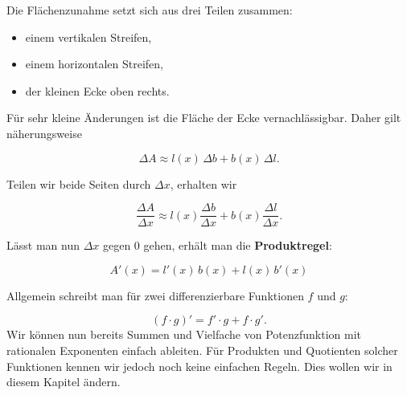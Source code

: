 \begin{center}
\end{center}

Die Flächenzunahme setzt sich aus drei Teilen zusammen:

\begin{itemize}
    \item einem vertikalen Streifen,
    \item einem horizontalen Streifen,
    \item der kleinen Ecke oben rechts.
\end{itemize}

Für sehr kleine Änderungen ist die Fläche der Ecke vernachlässigbar. Daher gilt näherungsweise

\[
    \Delta A
    \approx
    l(x)\,\Delta b
    +
    b(x)\,\Delta l.
\]

Teilen wir beide Seiten durch \(\Delta x\), erhalten wir

\[
    \frac{\Delta A}{\Delta x}
    \approx
    l(x)\frac{\Delta b}{\Delta x}
    +
    b(x)\frac{\Delta l}{\Delta x}.
\]

Lässt man nun \(\Delta x\) gegen \(0\) gehen, erhält man die \textbf{Produktregel}:

\[
    \boxed{
        A'(x)=l'(x)\,b(x)+l(x)\,b'(x)
    }
\]

Allgemein schreibt man für zwei differenzierbare Funktionen \(f\) und \(g\):

\[
    \boxed{
        (f\cdot g)'=f'\cdot g+f\cdot g'.
    }
\]
Wir können nun bereits Summen und Vielfache von Potenzfunktion mit rationalen Exponenten einfach ableiten. Für Produkten und Quotienten solcher Funktionen kennen wir jedoch noch keine einfachen Regeln. Dies wollen wir in diesem Kapitel ändern.

